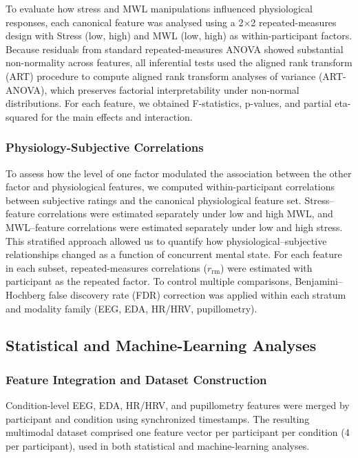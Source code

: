 \documentclass[lettersize,journal]{IEEEtran}
\begin{document}
To evaluate how stress and MWL manipulations influenced physiological responses, each canonical feature was analysed using a 2×2 repeated-measures design with Stress (low, high) and MWL (low, high) as within-participant factors. Because residuals from standard repeated-measures ANOVA showed substantial non-normality across features, all inferential tests used the aligned rank transform (ART) procedure to compute aligned rank transform analyses of variance (ART-ANOVA), which preserves factorial interpretability under non-normal distributions. For each feature, we obtained F-statistics, p-values, and partial eta-squared for the main effects and interaction.


\subsubsection{Physiology-Subjective Correlations}

To assess how the level of one factor modulated the association between the other factor and physiological features, we computed within-participant correlations between subjective ratings and the canonical physiological feature set. Stress–feature correlations were estimated separately under low and high MWL, and MWL–feature correlations were estimated separately under low and high stress. This stratified approach allowed us to quantify how physiological–subjective relationships changed as a function of concurrent mental state. For each feature in each subset, repeated-measures correlations ($r_{\mathrm{rm}}$) were estimated with participant as the repeated factor. To control multiple comparisons, Benjamini–Hochberg false discovery rate (FDR) correction was applied within each stratum and modality family (EEG, EDA, HR/HRV, pupillometry).


\subsection{Statistical and Machine-Learning Analyses}

\subsubsection{Feature Integration and Dataset Construction}
Condition-level EEG, EDA, HR/HRV, and pupillometry features were merged by participant and condition using synchronized timestamps. The resulting multimodal dataset comprised one feature vector per participant per condition (4 per participant), used in both statistical and machine-learning analyses.
\end{document}
